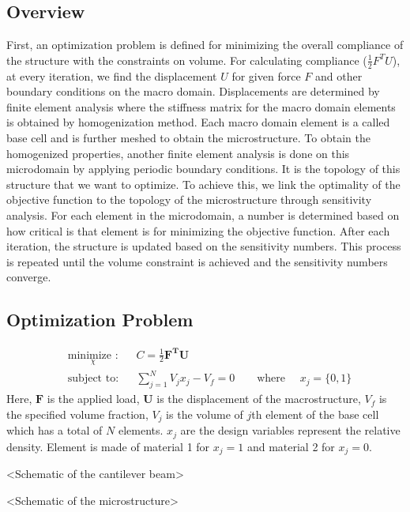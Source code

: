 \documentclass[10pt]{article}
\begin{document}
\subsection{Overview}
First, an optimization problem is defined for minimizing the overall compliance of the structure with the constraints on volume. For calculating compliance ($\frac{1}{2}F^TU$), at every iteration, we find the displacement $U$ for given force $F$ and other boundary conditions on the macro domain. Displacements are determined by finite element analysis where the stiffness matrix for the macro domain elements is obtained by homogenization method. Each macro domain element is a called base cell and is further meshed to obtain the microstructure. To obtain the homogenized properties, another finite element analysis is done on this microdomain by applying periodic boundary conditions. It is the topology of this structure that we want to optimize. To achieve this, we link the optimality of the objective function to the topology of the microstructure through sensitivity analysis. For each element in the microdomain, a number is determined based on how critical is that element is for minimizing the objective function. After each iteration, the structure is updated based on the sensitivity numbers. This process is repeated until the volume constraint is achieved and the sensitivity numbers converge.

\subsection{Optimization Problem}
\begin{equation}
\label{eq:2dopt}
\begin{aligned}
& \underset{\chi}{\text{minimize :}}
& &  C = \frac{1}{2}\textbf{F}^\textbf{T}\textbf{U}\\
& \text{subject to:}
& & \sum_{j=1}^N V_j x_j - V_f = 0 \qquad \text{where }\quad x_j = \{0, 1\}
\end{aligned}
\end{equation}
Here, $\textbf{F}$ is the applied load, $\textbf{U}$ is the displacement of the macrostructure, $V_f$ is the specified volume fraction, $V_j$ is the volume of $j$th element of the base cell which has a total of $N$ elements. $x_j$ are the design variables represent the relative density. Element is made of material 1 for $x_j=1$ and material 2 for $x_j=0$. 

<Schematic of the cantilever beam>

<Schematic of the microstructure>
\end{document}
